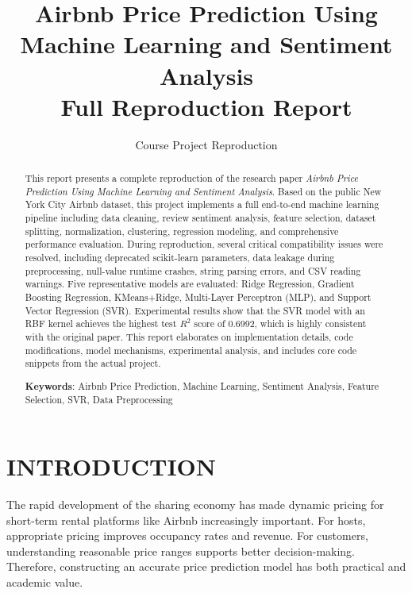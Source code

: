 \documentclass[11pt,a4paper]{article}
\begin{document}
\title{\bf Airbnb Price Prediction Using Machine Learning and Sentiment Analysis \\ Full Reproduction Report}
\author{Course Project Reproduction}
\date{}
\maketitle

\begin{abstract}
This report presents a complete reproduction of the research paper \textit{Airbnb Price Prediction Using Machine Learning and Sentiment Analysis}. Based on the public New York City Airbnb dataset, this project implements a full end-to-end machine learning pipeline including data cleaning, review sentiment analysis, feature selection, dataset splitting, normalization, clustering, regression modeling, and comprehensive performance evaluation. During reproduction, several critical compatibility issues were resolved, including deprecated scikit-learn parameters, data leakage during preprocessing, null-value runtime crashes, string parsing errors, and CSV reading warnings. Five representative models are evaluated: Ridge Regression, Gradient Boosting Regression, KMeans+Ridge, Multi-Layer Perceptron (MLP), and Support Vector Regression (SVR). Experimental results show that the SVR model with an RBF kernel achieves the highest test $R^2$ score of 0.6992, which is highly consistent with the original paper. This report elaborates on implementation details, code modifications, model mechanisms, experimental analysis, and includes core code snippets from the actual project.

\vspace{1mm}
\textbf{Keywords}: Airbnb Price Prediction, Machine Learning, Sentiment Analysis, Feature Selection, SVR, Data Preprocessing
\end{abstract}

\newpage

\section{INTRODUCTION}
The rapid development of the sharing economy has made dynamic pricing for short-term rental platforms like Airbnb increasingly important. For hosts, appropriate pricing improves occupancy rates and revenue. For customers, understanding reasonable price ranges supports better decision-making. Therefore, constructing an accurate price prediction model has both practical and academic value.
\end{document}
